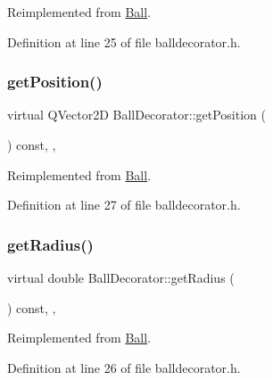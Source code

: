 Reimplemented from \mbox{\hyperlink{class_ball_a4b8e6ae922e7c1bfe6ab4568a591580e}{Ball}}.



Definition at line 25 of file balldecorator.\+h.

\mbox{\label{class_ball_decorator_a40b5df839e4f1aaec4ee792749757848}} 
\subsubsection{\texorpdfstring{get\+Position()}{getPosition()}}
{\footnotesize\ttfamily virtual Q\+Vector2D Ball\+Decorator\+::get\+Position (\begin{DoxyParamCaption}{ }\end{DoxyParamCaption}) const\hspace{0.3cm}{\ttfamily [inline]}, {\ttfamily [override]}, {\ttfamily [virtual]}}



Reimplemented from \mbox{\hyperlink{class_ball_a8861d6e0221d1b4d8468458fc2ec9b3c}{Ball}}.



Definition at line 27 of file balldecorator.\+h.

\mbox{\label{class_ball_decorator_af842f5b568d3baa21fd68bb4ede7068a}} 
\subsubsection{\texorpdfstring{get\+Radius()}{getRadius()}}
{\footnotesize\ttfamily virtual double Ball\+Decorator\+::get\+Radius (\begin{DoxyParamCaption}{ }\end{DoxyParamCaption}) const\hspace{0.3cm}{\ttfamily [inline]}, {\ttfamily [override]}, {\ttfamily [virtual]}}



Reimplemented from \mbox{\hyperlink{class_ball_a311b644cb28ee7c864806312ff52a594}{Ball}}.



Definition at line 26 of file balldecorator.\+h.

